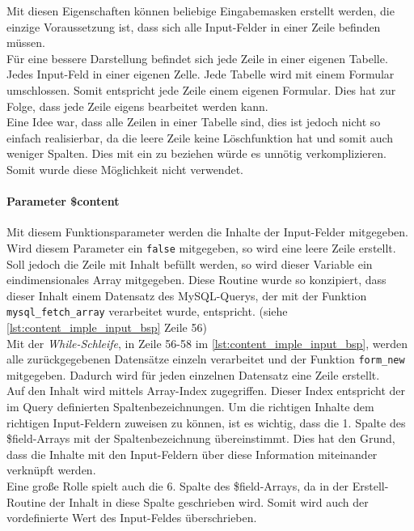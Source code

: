 Mit diesen Eigenschaften können beliebige Eingabemasken erstellt werden, die einzige Voraussetzung ist, dass sich alle Input-Felder in einer Zeile  befinden müssen.\\
Für eine bessere Darstellung befindet sich jede Zeile in einer eigenen Tabelle. Jedes Input-Feld in einer eigenen Zelle. Jede Tabelle wird mit einem Formular umschlossen. Somit entspricht jede Zeile einem eigenen Formular. Dies hat zur Folge, dass jede Zeile eigens bearbeitet werden kann.\\
Eine Idee war, dass alle Zeilen in einer Tabelle sind, dies ist jedoch nicht so einfach realisierbar, da die leere Zeile keine Löschfunktion hat und somit auch weniger Spalten. Dies mit ein zu beziehen würde es unnötig verkomplizieren. Somit wurde diese Möglichkeit nicht verwendet.
\newpage
\paragraph{Parameter \$content\\}
Mit diesem Funktionsparameter werden die Inhalte der Input-Felder mitgegeben. Wird diesem Parameter ein \texttt{false} mitgegeben, so wird eine leere Zeile erstellt. Soll jedoch die Zeile mit Inhalt befüllt werden, so wird dieser Variable ein eindimensionales Array mitgegeben. Diese Routine wurde so konzipiert, dass dieser Inhalt einem Datensatz des MySQL-Querys, der mit der Funktion \texttt{mysql\_fetch\_array} verarbeitet wurde, entspricht. (siehe \autoref{lst:content_imple_input_bsp} Zeile 56)\\
Mit der \textit{While-Schleife}, in Zeile 56-58 im \autoref{lst:content_imple_input_bsp}, werden alle zurückgegebenen Datensätze einzeln verarbeitet und der Funktion \texttt{form\_new} mitgegeben. Dadurch wird für jeden einzelnen Datensatz eine Zeile erstellt.\\
Auf den Inhalt wird mittels Array-Index zugegriffen. Dieser Index entspricht der im Query definierten Spaltenbezeichnungen. Um die richtigen Inhalte dem richtigen Input-Feldern zuweisen zu können, ist es wichtig, dass die 1. Spalte des \$field-Arrays mit der Spaltenbezeichnung übereinstimmt. Dies hat den Grund, dass die Inhalte mit den Input-Feldern über diese Information miteinander verknüpft werden.\\
Eine große Rolle spielt auch die 6. Spalte des \$field-Arrays, da in der Erstell-Routine der Inhalt in diese Spalte geschrieben wird. Somit wird auch der vordefinierte Wert des Input-Feldes überschrieben.\\

